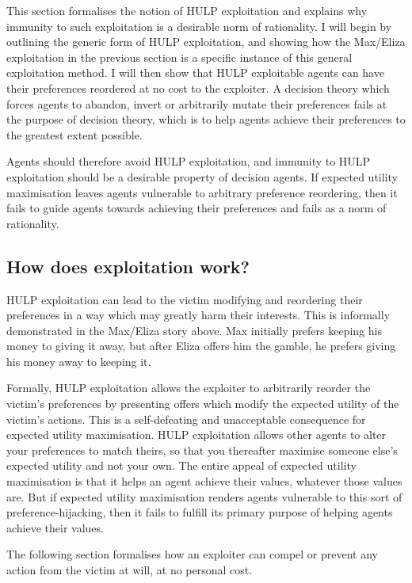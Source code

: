 \documentclass{article}
\begin{document}
This section formalises the notion of HULP exploitation and explains why immunity to such exploitation is a desirable norm of rationality. I will begin by outlining the generic form of HULP exploitation, and showing how the Max/Eliza exploitation in the previous section is a specific instance of this general exploitation method. I will then show that HULP exploitable agents can have their preferences reordered at no cost to the exploiter. A decision theory which forces agents to abandon, invert or arbitrarily mutate their preferences fails at the purpose of decision theory, which is to help agents achieve their preferences to the greatest extent possible. 

Agents should therefore avoid HULP exploitation, and immunity to HULP exploitation should be a desirable property of decision agents. If expected utility maximisation leaves agents vulnerable to arbitrary preference reordering, then it fails to guide agents towards achieving their preferences and fails as a norm of rationality. 

\subsection{How does exploitation work?}

HULP exploitation can lead to the victim modifying and reordering their preferences in a way which may greatly harm their interests. This is informally demonstrated in the Max/Eliza story above. Max initially prefers keeping his money to giving it away, but after Eliza offers him the gamble, he prefers giving his money away to keeping it.

Formally, HULP exploitation allows the exploiter to arbitrarily reorder the victim's preferences by presenting offers which modify the expected utility of the victim's actions. This is a self-defeating and unacceptable consequence for expected utility maximisation. HULP exploitation allows other agents to alter your preferences to match theirs, so that you thereafter maximise someone else's expected utility and not your own. The entire appeal of expected utility maximisation is that it helps an agent achieve their values, whatever those values are. But if expected utility maximisation renders agents vulnerable to this sort of preference-hijacking, then it fails to fulfill its primary purpose of helping agents achieve their values.

The following section formalises how an exploiter can compel or prevent any action from the victim at will, at no personal cost. 
\end{document}
